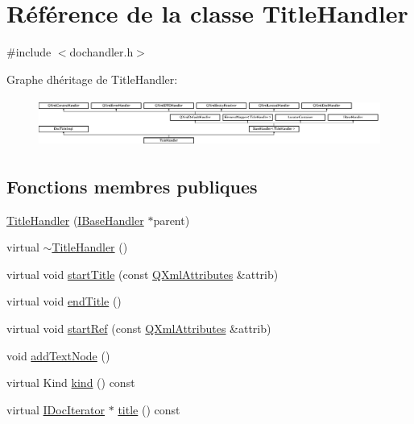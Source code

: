 \hypertarget{class_title_handler}{}\section{Référence de la classe Title\+Handler}
\label{class_title_handler}


{\ttfamily \#include $<$dochandler.\+h$>$}

Graphe d\textquotesingle{}héritage de Title\+Handler\+:\begin{figure}[H]
\begin{center}
\leavevmode
\includegraphics[height=1.600000cm]{class_title_handler}
\end{center}
\end{figure}
\subsection*{Fonctions membres publiques}
\begin{DoxyCompactItemize}
\item 
\hyperlink{class_title_handler_ade8d9164f3dfd1b45bfab110928c0f8b}{Title\+Handler} (\hyperlink{class_i_base_handler}{I\+Base\+Handler} $\ast$parent)
\item 
virtual \hyperlink{class_title_handler_a12d9a3fa62acd66fc0609fcb060ce1e2}{$\sim$\+Title\+Handler} ()
\item 
virtual void \hyperlink{class_title_handler_a4fc6869b55716807130b2774adb16a16}{start\+Title} (const \hyperlink{class_q_xml_attributes}{Q\+Xml\+Attributes} \&attrib)
\item 
virtual void \hyperlink{class_title_handler_af501d456bfcf76499929160699337c47}{end\+Title} ()
\item 
virtual void \hyperlink{class_title_handler_ae4b1ab2cf35da1c32757248c43418304}{start\+Ref} (const \hyperlink{class_q_xml_attributes}{Q\+Xml\+Attributes} \&attrib)
\item 
void \hyperlink{class_title_handler_a371f5233dc3d9db0fc5634d69e805a8a}{add\+Text\+Node} ()
\item 
virtual Kind \hyperlink{class_title_handler_a640f51c3e6f4ec04a6427aa687b8fad3}{kind} () const 
\item 
virtual \hyperlink{class_i_doc_iterator}{I\+Doc\+Iterator} $\ast$ \hyperlink{class_title_handler_a859079cf84ce789056f44b77bc994983}{title} () const 
\end{DoxyCompactItemize}
